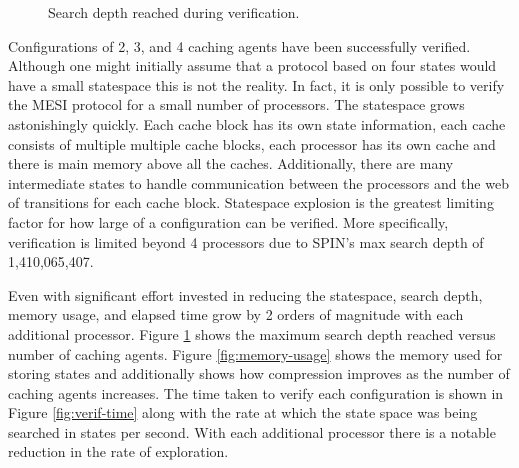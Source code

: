 \documentclass[12pt]{article}
\begin{document}
\begin{figure}[b!]
    \centering

    \caption{Search depth reached during verification.}
    \label{fig:search-depth}
\end{figure}

Configurations of 2, 3, and 4 caching agents have been successfully verified. Although one might initially assume that a protocol based on four states would have a small statespace this is not the reality. In fact, it is only possible to verify the MESI protocol for a small number of processors. The statespace grows astonishingly quickly. Each cache block has its own state information, each cache consists of multiple multiple cache blocks, each processor has its own cache and there is main memory above all the caches. Additionally, there are many intermediate states to handle communication between the processors and the web of transitions for each cache block. Statespace explosion is the greatest limiting factor for how large of a configuration can be verified. More specifically, verification is limited beyond 4 processors due to SPIN's max search depth of 1,410,065,407.

Even with significant effort invested in reducing the statespace, search depth, memory usage, and elapsed time grow by 2 orders of magnitude with each additional processor. Figure \ref{fig:search-depth} shows the maximum search depth reached versus number of caching agents. Figure \ref{fig:memory-usage} shows the memory used for storing states and additionally shows how compression improves as the number of caching agents increases. The time taken to verify each configuration is shown in Figure \ref{fig:verif-time} along with the rate at which the state space was being searched in states per second. With each additional processor there is a notable reduction in the rate of exploration.
\end{document}
